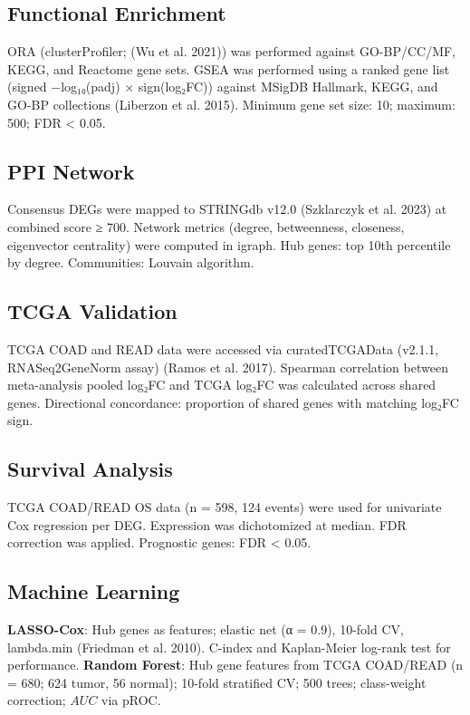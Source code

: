 \documentclass[
  12pt,
]{article}
\begin{document}
\subsection{Functional Enrichment}\label{functional-enrichment}

ORA (clusterProfiler; (Wu et al. 2021)) was performed against
GO-BP/CC/MF, KEGG, and Reactome gene sets. GSEA was performed using a
ranked gene list (signed −log₁₀(padj) × sign(log₂FC)) against MSigDB
Hallmark, KEGG, and GO-BP collections (Liberzon et al. 2015). Minimum
gene set size: 10; maximum: 500; FDR \textless{} 0.05.

\subsection{PPI Network}\label{ppi-network}

Consensus DEGs were mapped to STRINGdb v12.0 (Szklarczyk et al. 2023) at
combined score ≥ 700. Network metrics (degree, betweenness, closeness,
eigenvector centrality) were computed in igraph. Hub genes: top 10th
percentile by degree. Communities: Louvain algorithm.

\subsection{TCGA Validation}\label{tcga-validation}

TCGA COAD and READ data were accessed via curatedTCGAData (v2.1.1,
RNASeq2GeneNorm assay) (Ramos et al. 2017). Spearman correlation between
meta-analysis pooled log₂FC and TCGA log₂FC was calculated across shared
genes. Directional concordance: proportion of shared genes with matching
log₂FC sign.

\subsection{Survival Analysis}\label{survival-analysis}

TCGA COAD/READ OS data (n = 598, 124 events) were used for univariate
Cox regression per DEG. Expression was dichotomized at median. FDR
correction was applied. Prognostic genes: FDR \textless{} 0.05.

\subsection{Machine Learning}\label{machine-learning}

\textbf{LASSO-Cox}: Hub genes as features; elastic net (α = 0.9),
10-fold CV, lambda.min (Friedman et al. 2010). C-index and Kaplan-Meier
log-rank test for performance. \textbf{Random Forest}: Hub gene features
from TCGA COAD/READ (n = 680; 624 tumor, 56 normal); 10-fold stratified
CV; 500 trees; class-weight correction; \(AUC\) via pROC.
\end{document}
